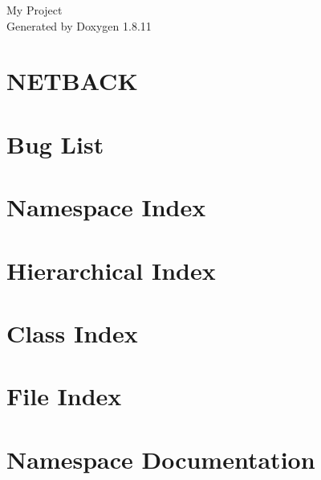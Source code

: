 \documentclass[twoside]{book}
\newcommand{\+}{\discretionary{\mbox{\scriptsize$\hookleftarrow$}}{}{}}
\newcommand{\clearemptydoublepage}{%
  \newpage{\pagestyle{empty}\cleardoublepage}%
}
\begin{document}
\hypersetup{pageanchor=false,
             bookmarksnumbered=true,
             pdfencoding=unicode
            }
\begin{titlepage}
\vspace*{7cm}
\begin{center}%
{\Large My Project }\\
\vspace*{1cm}
{\large Generated by Doxygen 1.8.11}\\
\end{center}
\end{titlepage}
\clearemptydoublepage
\tableofcontents
\clearemptydoublepage
{}
\hypersetup{pageanchor=true}

\chapter{N\+E\+T\+B\+A\+CK}
\label{md_README}
\hypertarget{md_README}{}

\chapter{Bug List}
\label{bug}
\hypertarget{bug}{}

\chapter{Namespace Index}

\chapter{Hierarchical Index}

\chapter{Class Index}

\chapter{File Index}

\chapter{Namespace Documentation}

\end{document}
